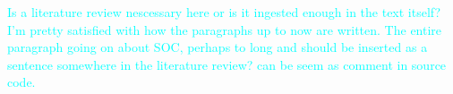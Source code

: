 \documentclass[pdflatex]{sn-jnl}
\newcommand{\neri}[1]{{\textcolor{cyan}{#1}}}
\begin{document}
\neri{Is a literature review nescessary here or is it ingested enough in the text itself? I'm pretty satisfied with how the paragraphs up to now are written.}\newline
\neri{The entire paragraph going on about SOC, perhaps to long and should be inserted as a sentence somewhere in the literature review? can be seem as comment in source code.}
\end{document}
